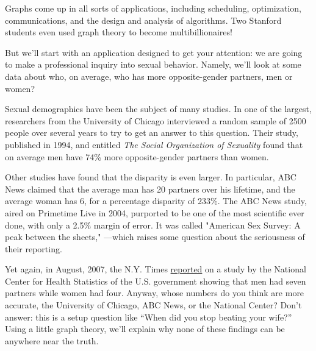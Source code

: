 %
%
%
%
%

\label{simple_graphs_chap}

Graphs come up in all sorts of applications, including scheduling,
optimization, communications, and the design and analysis of algorithms.
Two Stanford students even used graph theory to become multibillionaires!

But we'll start with an application designed to get your attention: we are
going to make a professional inquiry into sexual behavior.  Namely, we'll
look at some data about who, on average, who has more opposite-gender
partners, men or women?

Sexual demographics have been the subject of many studies.  In one of the
largest, researchers from the University of Chicago interviewed a random
sample of 2500 people over several years to try to get an answer to this
question.  Their study, published in 1994, and entitled \emph{The Social
  Organization of Sexuality} found that on average men have 74\% more
opposite-gender partners than women.

Other studies have found that the disparity is even larger.  In
particular, ABC News claimed that the average man has 20 partners over his
lifetime, and the average woman has 6, for a percentage disparity of
233\%.  The ABC News study, aired on Primetime Live in 2004, purported to
be one of the most scientific ever done, with only a 2.5\% margin of
error.  It was called "American Sex Survey: A peak between the sheets,"
---which raises some question about the seriousness of their reporting.

Yet again, in August, 2007, the N.Y. Times
\href{http://www.nytimes.com/2007/08/12/weekinreview/12kolata.html?_r=1&n=Top/Reference/Times%20Topics/People/K/Kolata,%20Gina&oref=slogin}{reported} on a study by the
  National Center for Health Statistics of the U.S. government showing
  that men had seven partners while women had four.
  Anyway, whose numbers do you think are more accurate, the University of
  Chicago, ABC News, or the National Center?  Don't answer: this is a setup
  question like ``When did you stop beating your wife?''  Using a little
  graph theory, we'll explain why none of these findings can be anywhere
  near the truth.

